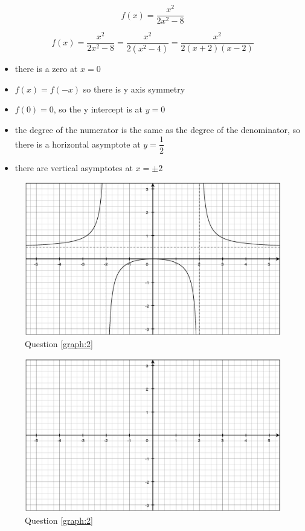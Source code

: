 \documentclass[fleqn,addpoints]{exam}
\begin{document}
\begin{questions}
\ifprintanswers
\else
\pagebreak
\fi

\question[10]
\label{graph:2}

\[
  f(x) = \frac{x^2}{2x^2-8}
\]

\begin{solution}[6 cm]
\[
  f(x) = \frac{x^2}{2x^2-8} = \frac{x^2}{2(x^2-4)} = \frac{x^2}{2(x+2)(x-2)}
\]

\begin{itemize}
  \item there is a zero at $x=0$
  \item $f(x) = f(-x)$ so there is y axis symmetry
  \item $f(0) = 0$, so the y intercept is at $y=0$
  \item the degree of the numerator is the same as the degree of the denominator, so there is a horizontal asymptote at
    $y = \dfrac{1}{2}$
  \item there are vertical asymptotes at $x=\pm 2$
\end{itemize}

\end{solution}

\ifprintanswers
\begin{figure}[H]
  \centering
  \includegraphics[scale=0.4]{graph_2_solution.eps}
  \caption*{Question \ref{graph:2}}
\end{figure}
\else
\begin{figure}[H]
  \centering
  \includegraphics[scale=0.6]{graph_2_blank.eps}
  \caption*{Question \ref{graph:2}}
\end{figure}
\fi


\end{questions}
\end{document}
